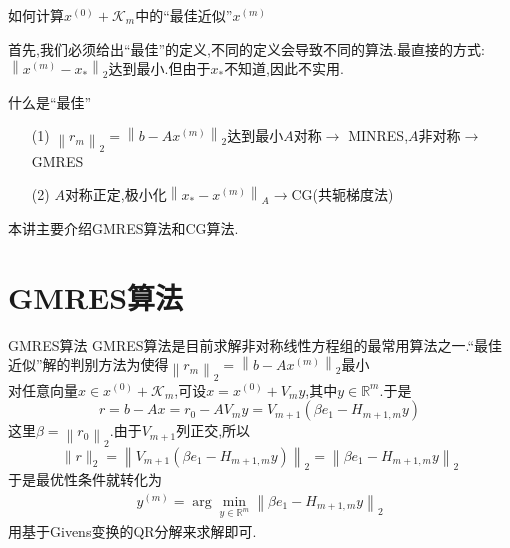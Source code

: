 \documentclass[notheorems,serif]{beamer}
\renewcommand{\normalsize}{\wuhao}
\newcommand{\wuhao}{\fontsize{10.5pt}{\baselineskip}\selectfont}
\begin{document}
\begin{frame}


{\color{blue}\Large 如何计算$x^{(0)}+\mathcal{K}_{m}$中的“最佳近似”$x^{(m)}$}

\quad

\normalsize
首先,我们必须给出“最佳”的定义,不同的定义会导致不同的算法.最直接的方式:$\left\|x^{(m)}-x_{*}\right\|_{2}$达到最小.但由于$x_{*}$不知道,因此不实用.

{\color{blue}什么是“最佳”}

\begin{itemize}
\item[(1)] $\left\|r_{m}\right\|_{2}=\left\|b-A x^{(m)}\right\|_{2}$达到最小$A$对称$\to$ {\color{blue}MINRES},$A$非对称$\to${\color{blue}GMRES}
	\item[(2)] $A$对称正定,极小化$\left\|x_{*}-x^{(m)}\right\|_{A} \rightarrow \mathrm{CG}$(共轭梯度法)
\end{itemize}
本讲主要介绍{\color{blue}GMRES}算法和{\color{blue}CG}算法.\\
\end{frame}


\section{GMRES算法}
\begin{frame}
{GMRES算法}
GMRES算法是目前求解非对称线性方程组的最常用算法之一.“最佳近似”解的判别方法为{\color{blue}使得$\left\|r_{m}\right\|_{2}=\left\|b-A x^{(m)}\right\|_{2}$最小}\\
对任意向量$x \in x^{(0)}+\mathcal{K}_{m}$,可设$x=x^{(0)}+V_{m} y$,其中$y \in \mathbb{R}^{m}$.于是
$$
r=b-A x=r_{0}-A V_{m} y=V_{m+1}\left(\beta e_{1}-H_{m+1, m} y\right)
$$
这里$\beta=\left\|r_{0}\right\|_{2}$.由于$V_{m+1}$列正交,所以
$$
\|r\|_{2}=\left\|V_{m+1}\left(\beta e_{1}-H_{m+1, m} y\right)\right\|_{2}=\left\|\beta e_{1}-H_{m+1, m} y\right\|_{2}
$$
于是最优性条件就转化为
\begin{align*}
	y^{(m)}=\arg \min _{y \in \mathbb{R}^{m}}\left\|\beta e_{1}-H_{m+1, m} y\right\|_{2}\tag{7.6}
\end{align*}
用基于Givens变换的QR分解来求解即可.\\
\end{frame}
\end{document}
